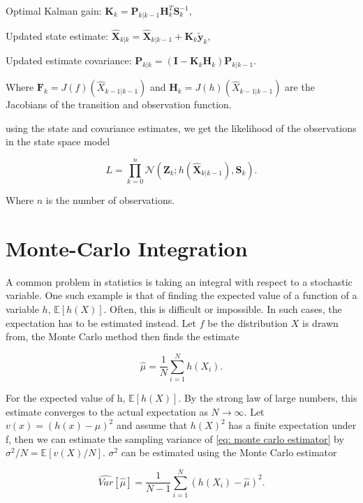 Optimal Kalman gain: $\textbf{K}_k = \textbf{P}_{k|k-1} \textbf{H}_k^T \textbf{S}_k^{-1},$

Updated state estimate: $\bm{\hat X}_{k|k} = \bm{\hat X}_{k|k-1} + \textbf{K}_k \bm{\tilde y}_{k},$

Updated estimate covariance: $\textbf{P}_{k|k} = (\textbf{I} - \textbf{K}_k \textbf{H}_k)\textbf{P}_{k|k-1}.$



Where $\textbf{F}_k = J (f)(\hat{X}_{k-1|k-1})$ and $\textbf{H}_k = J( h)(\hat{X}_{k-1|k-1})$ are the Jacobians of the transition and observation function.



using the state and covariance estimates, we get the likelihood of the observations in the state space model

$$L = \prod_{k=0}^n \mathcal{N}(\textbf{Z}_k; h(\hat{\textbf{X}}_{k|k-1}), \textbf{S}_k) \label{eq: EKF likelihood}.$$

Where $n$ is the number of observations.\parencite{kulikov_extended_2024}


\section{Monte-Carlo Integration}
\label{sec: Monte Carlo integration}
A common problem in statistics is taking an integral with respect to a stochastic variable. One such example is that of finding the expected value of a function of a variable $h$, $\mathbb{E}[h(X)]$. Often, this is difficult or impossible. In such cases, the expectation has to be estimated instead. Let $f$ be the distribution $X$ is drawn from, the Monte Carlo method then finds the estimate 

\begin{equation}
\hat{\mu} = \frac{1}{N} \sum_{i=1}^N h(X_i).
\label{eq: monte carlo estimator}    
\end{equation}
  
For the expected value of h, $\mathbb{E}[h(X)]$. By the strong law of large numbers, this estimate converges to the actual expectation as $N\rightarrow\infty$. Let $v(x) = (h(x) - {\mu})^2$ and assume that $h(X)^2$ has a finite expectation under f, then we can estimate the sampling variance of \eqref{eq: monte carlo estimator} by $\sigma^2/N = \mathbb{E}[v(X)/N]$. $\sigma^2$ can be estimated using the Monte Carlo estimator

$$
    \widehat{Var}[\hat{\mu}] = \frac{1}{N-1}\sum_{i=1}^N (h(X_i) - \hat{\mu})^2.
$$

